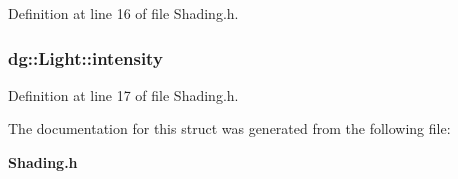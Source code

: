 Definition at line 16 of file Shading.h.
\subsubsection{ dg::Light::intensity}\label{structdg_1_1Light_m1}




Definition at line 17 of file Shading.h.

The documentation for this struct was generated from the following file:\begin{CompactItemize}
\item 
{\bf Shading.h}\end{CompactItemize}
